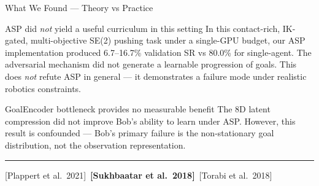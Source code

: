 \documentclass[aspectratio=169,xcolor=dvipsnames,t]{beamer}
\newcommand{\litfooter}[1]{%
  \vspace{2pt}%
  \hrule%
  \vspace{2pt}%
  {\tiny\color{LightDarkGrey} #1}%
}
\begin{document}
\begin{frame}[t]{What We Found — Theory vs Practice}
  \begin{exampleblock}{ASP did \emph{not} yield a useful curriculum in this setting}
    In this contact-rich, IK-gated, multi-objective SE(2) pushing task under a single-GPU budget, our ASP implementation produced 6.7--16.7\% validation SR vs 80.0\% for single-agent. The adversarial mechanism did not generate a learnable progression of goals. This does \emph{not} refute ASP in general — it demonstrates a failure mode under realistic robotics constraints.
  \end{exampleblock}

  \vspace{1pt}
  \begin{exampleblock}{GoalEncoder bottleneck provides no measurable benefit}
    The 8D latent compression did not improve Bob's ability to learn under ASP. However, this result is confounded — Bob's primary failure is the non-stationary goal distribution, not the observation representation.
  \end{exampleblock}

  \vfill\litfooter{[Plappert et al.\ 2021]~\textbf{[Sukhbaatar et al.\ 2018]}~[Torabi et al.\ 2018]}
\end{frame}

\end{document}
